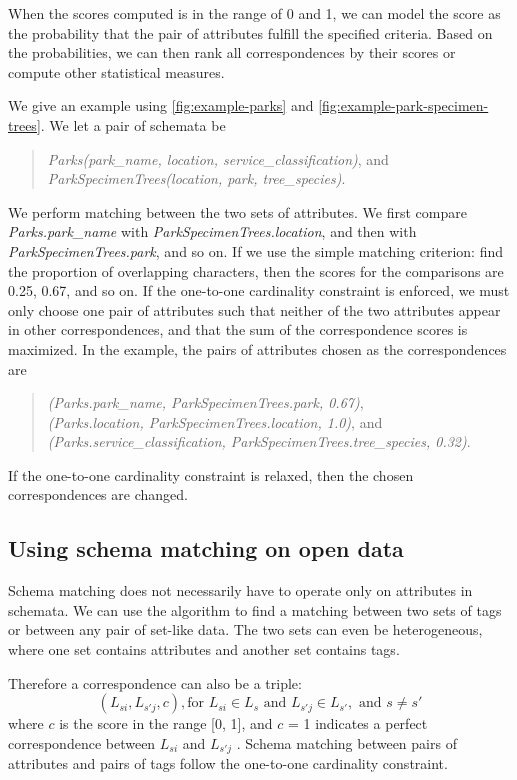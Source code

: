 When the scores computed is in the range of 0 and 1, we can model the score as the probability that the pair of attributes fulfill the specified criteria. Based on the probabilities, we can then rank all correspondences by their scores or compute other statistical measures.

We give an example using \autoref{fig:example-parks} and \autoref{fig:example-park-specimen-trees}. We let a pair of schemata be
\begin{quote}
    \textit{Parks(park\_name, location, service\_classification)}, and \\
    \textit{ParkSpecimenTrees(location, park, tree\_species)}.
\end{quote}

We perform matching between the two sets of attributes. We first compare \textit{Parks.park\_name} with \textit{ParkSpecimenTrees.location}, and then with \textit{ParkSpecimenTrees.park}, and so on. If we use the simple matching criterion: find the proportion of overlapping characters, then the scores for the comparisons are 0.25, 0.67, and so on. If the one-to-one cardinality constraint is enforced, we must only choose one pair of attributes such that neither of the two attributes appear in other correspondences, and that the sum of the correspondence scores is maximized. In the example, the pairs of attributes chosen as the correspondences are
\begin{quote}
\textit{(Parks.park\_name, ParkSpecimenTrees.park, 0.67)}, \\
\textit{(Parks.location, ParkSpecimenTrees.location, 1.0)}, and \\
\textit{(Parks.service\_classification, ParkSpecimenTrees.tree\_species, 0.32)}.
\end{quote}
If the one-to-one cardinality constraint is relaxed, then the chosen correspondences are changed.

\subsection{Using schema matching on open data}
\label{ssec:UsingSchemaMatchingOnOpenData}

Schema matching does not necessarily have to operate only on attributes in schemata. We can use the algorithm to find a matching between two sets of tags or between any pair of set-like data. The two sets can even be heterogeneous, where one set contains attributes and another set contains tags.

Therefore a correspondence can also be a triple:
\[
(L_{si},L_{s'j},c),\text{for }L_{si}\in L_{s}\text{ and }L_{s'j}\in L_{s'},\text{ and }s\neq s'
\]
where $c$ is the score in the range [0, 1], and $c$ = 1 indicates a perfect correspondence between $L_{si}$ and $L_{s'j}$ . Schema matching between pairs of attributes and pairs of tags follow the one-to-one cardinality constraint.

